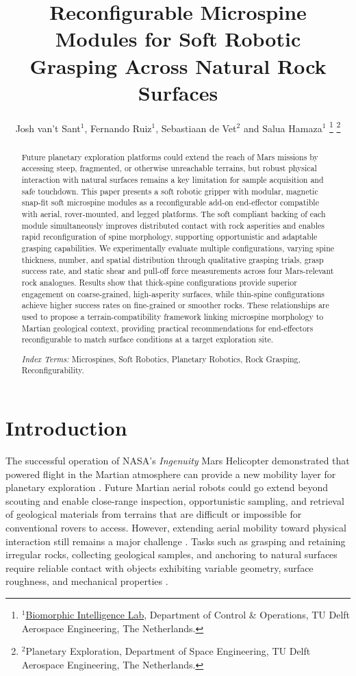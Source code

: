\documentclass[letterpaper, 10 pt, conference, twoside]{ieeetran}
\title{\LARGE \bf
Reconfigurable Microspine Modules for Soft Robotic \\ Grasping Across Natural Rock Surfaces}
\author{Josh van't Sant$^{1}$, Fernando Ruiz$^{1}$, Sebastiaan de Vet$^{2}$ and Salua Hamaza$^{1}$
\thanks{$^{1}$\href{https://www.tudelft.nl/en/ai/biomorphic-intelligence-lab}{Biomorphic Intelligence Lab}, Department of Control \& Operations, TU Delft Aerospace Engineering, The Netherlands. }
\thanks{$^{2}$Planetary Exploration, Department of Space Engineering, TU Delft Aerospace Engineering, The Netherlands.}
}%
\begin{document}
\maketitle
\begin{abstract}

Future planetary exploration platforms could extend the reach of Mars missions by accessing steep, fragmented, or otherwise unreachable terrains, but robust physical interaction with natural surfaces remains a key limitation for sample acquisition and safe touchdown. This paper presents a soft robotic gripper with modular, magnetic snap-fit soft microspine modules as a reconfigurable add-on end-effector compatible with aerial, rover-mounted, and legged platforms. The soft compliant backing of each module simultaneously improves distributed contact with rock asperities and enables rapid reconfiguration of spine morphology, supporting opportunistic and adaptable grasping capabilities. We experimentally evaluate multiple configurations, varying spine thickness, number, and spatial distribution through qualitative grasping trials, grasp success rate, and static shear and pull-off force measurements across four Mars-relevant rock analogues. Results show that thick-spine configurations provide superior engagement on coarse-grained, high-asperity surfaces, while thin-spine configurations achieve higher success rates on fine-grained or smoother rocks. These relationships are used to propose a terrain-compatibility framework linking microspine morphology to Martian geological context, providing practical recommendations for end-effectors reconfigurable to match surface conditions at a target exploration site.

\textit{Index Terms:} Microspines, Soft Robotics, Planetary Robotics, Rock Grasping, Reconfigurability.
\end{abstract}



\section{Introduction}

The successful operation of NASA's \textit{Ingenuity} Mars Helicopter demonstrated that powered flight in the Martian atmosphere can provide a new mobility layer for planetary exploration \cite{Balaram2021Ingenuity}. Future Martian aerial robots could go extend beyond scouting and enable close-range inspection, opportunistic sampling, and retrieval of geological materials from terrains that are difficult or impossible for conventional rovers to access. However, extending aerial mobility toward physical interaction still remains a major challenge \cite{Khamseh2018AerialManipulation}. Tasks such as grasping and retaining irregular rocks, collecting geological samples, and anchoring to natural surfaces require reliable contact with objects exhibiting variable geometry, surface roughness, and mechanical properties \cite{Parness2013RockClimbing,Backus2020Nautilus}.
\end{document}

